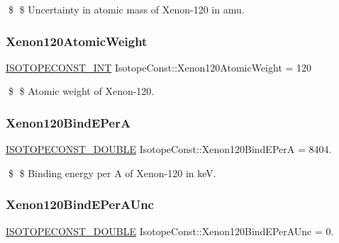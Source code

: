 \$ \$ Uncertainty in atomic mass of Xenon-\/120 in amu. \mbox{\label{group___isotope_const-_xenon-_xe120_gaeb479bf69869d736ecaa35c4b21b3c3b}} 
\subsubsection{\texorpdfstring{Xenon120\+Atomic\+Weight}{Xenon120AtomicWeight}}
{\footnotesize\ttfamily \mbox{\hyperlink{group___isotope_const-_macros_ga5f18360b3e99483a35c32d789e62621c}{I\+S\+O\+T\+O\+P\+E\+C\+O\+N\+S\+T\+\_\+\+I\+NT}} Isotope\+Const\+::\+Xenon120\+Atomic\+Weight = 120}

\$ \$ Atomic weight of Xenon-\/120. \mbox{\label{group___isotope_const-_xenon-_xe120_ga2cc1f93e30f9a86b2f9664dc2d418586}} 
\subsubsection{\texorpdfstring{Xenon120\+Bind\+E\+PerA}{Xenon120BindEPerA}}
{\footnotesize\ttfamily \mbox{\hyperlink{group___isotope_const-_macros_ga8f45a7272ce02c0b4c65c44636ed719a}{I\+S\+O\+T\+O\+P\+E\+C\+O\+N\+S\+T\+\_\+\+D\+O\+U\+B\+LE}} Isotope\+Const\+::\+Xenon120\+Bind\+E\+PerA = 8404.}

\$ \$ Binding energy per A of Xenon-\/120 in keV. \mbox{\label{group___isotope_const-_xenon-_xe120_ga37aa113f92c3d3e206925367bfffe5d7}} 
\subsubsection{\texorpdfstring{Xenon120\+Bind\+E\+Per\+A\+Unc}{Xenon120BindEPerAUnc}}
{\footnotesize\ttfamily \mbox{\hyperlink{group___isotope_const-_macros_ga8f45a7272ce02c0b4c65c44636ed719a}{I\+S\+O\+T\+O\+P\+E\+C\+O\+N\+S\+T\+\_\+\+D\+O\+U\+B\+LE}} Isotope\+Const\+::\+Xenon120\+Bind\+E\+Per\+A\+Unc = 0.}

